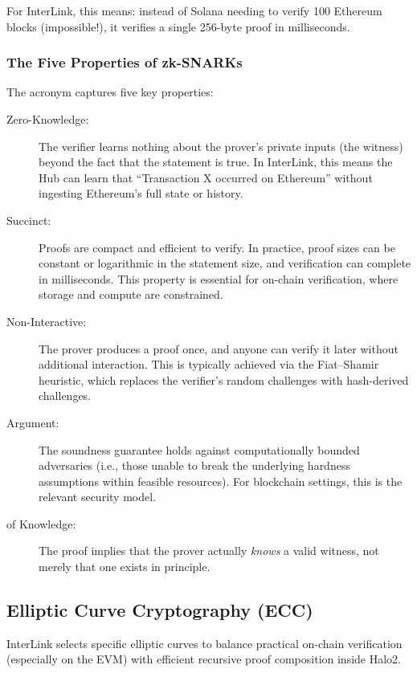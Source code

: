 \documentclass[11pt,a4paper]{article}
\begin{document}
For InterLink, this means: instead of Solana needing to verify 100 Ethereum blocks (impossible!), it verifies a single 256-byte proof in milliseconds.

\subsubsection{The Five Properties of zk-SNARKs}

The acronym captures five key properties:

\begin{description}
    \item[Zero-Knowledge:] The verifier learns nothing about the prover's private inputs (the witness) beyond the fact that the statement is true. In InterLink, this means the Hub can learn that ``Transaction X occurred on Ethereum'' without ingesting Ethereum's full state or history.
    
    \item[Succinct:] Proofs are compact and efficient to verify. In practice, proof sizes can be constant or logarithmic in the statement size, and verification can complete in milliseconds. This property is essential for on-chain verification, where storage and compute are constrained.
    
    \item[Non-Interactive:] The prover produces a proof once, and anyone can verify it later without additional interaction. This is typically achieved via the Fiat--Shamir heuristic, which replaces the verifier's random challenges with hash-derived challenges.
    
    \item[Argument:] The soundness guarantee holds against computationally bounded adversaries (i.e., those unable to break the underlying hardness assumptions within feasible resources). For blockchain settings, this is the relevant security model.
    
    \item[of Knowledge:] The proof implies that the prover actually \emph{knows} a valid witness, not merely that one exists in principle.
\end{description}

\subsection{Elliptic Curve Cryptography (ECC)}
InterLink selects specific elliptic curves to balance practical on-chain verification (especially on the EVM) with efficient recursive proof composition inside Halo2.
\end{document}
